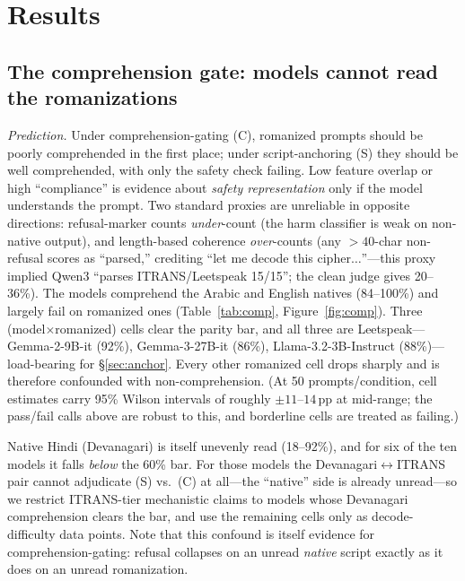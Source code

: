 \documentclass[11pt]{article}
\newcommand{\pp}{\,pp}
\begin{document}
\section{Results}

\subsection{The comprehension gate: models cannot read the romanizations}
\label{sec:gate}
\emph{Prediction.} Under comprehension-gating (C), romanized prompts should be poorly comprehended in the first place; under script-anchoring (S) they should be well comprehended, with only the safety check failing. Low feature overlap or high ``compliance'' is evidence about \emph{safety representation} only if the model understands the prompt. Two standard proxies are unreliable in opposite directions: refusal-marker counts \emph{under}-count (the harm classifier is weak on non-native output), and length-based coherence \emph{over}-counts (any ${>}40$-char non-refusal scores as ``parsed,'' crediting ``let me decode this cipher$\dots$''---this proxy implied Qwen3 ``parses ITRANS/Leetspeak 15/15''; the clean judge gives 20--36\%). The models comprehend the Arabic and English natives (84--100\%) and largely fail on romanized ones (Table~\ref{tab:comp}, Figure~\ref{fig:comp}). Three (model$\times$romanized) cells clear the parity bar, and all three are Leetspeak---Gemma-2-9B-it (92\%), Gemma-3-27B-it (86\%), Llama-3.2-3B-Instruct (88\%)---load-bearing for \S\ref{sec:anchor}. Every other romanized cell drops sharply and is therefore confounded with non-comprehension. (At 50 prompts/condition, cell estimates carry 95\% Wilson intervals of roughly ${\pm}11$--$14$\pp{} at mid-range; the pass/fail calls above are robust to this, and borderline cells are treated as failing.)

Native Hindi (Devanagari) is itself unevenly read (18--92\%), and for six of the ten models it falls \emph{below} the 60\% bar. For those models the Devanagari$\leftrightarrow$ITRANS pair cannot adjudicate (S) vs.\ (C) at all---the ``native'' side is already unread---so we restrict ITRANS-tier mechanistic claims to models whose Devanagari comprehension clears the bar, and use the remaining cells only as decode-difficulty data points. Note that this confound is itself evidence for comprehension-gating: refusal collapses on an unread \emph{native} script exactly as it does on an unread romanization.
\end{document}
